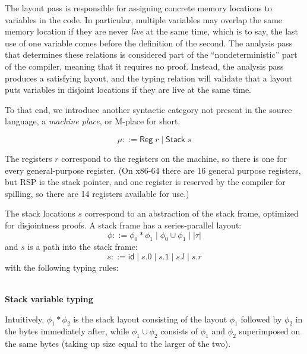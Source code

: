 \documentclass[acmsmall,nonacm]{acmart}
\newcommand{\proves}{\vdash}
\newcommand{\judgment}[2][]{\noindent\\\textbf{#1}\hspace{\stretch{1}}\fbox{$#2$}\nopagebreak}
\newcommand*{\axiom}[2][]{\infer[#1]{}{#2}}
\begin{document}
The layout pass is responsible for assigning concrete memory locations to variables in the code. In particular, multiple variables may overlap the same memory location if they are never \emph{live} at the same time, which is to say, the last use of one variable comes before the definition of the second. The analysis pass that determines these relations is considered part of the ``nondeterministic'' part of the compiler, meaning that it requires no proof. Instead, the analysis pass produces a satisfying layout, and the typing relation will validate that a layout puts variables in disjoint locations if they are live at the same time.

To that end, we introduce another syntactic category not present in the source language, a \emph{machine place}, or M-place for short.

$$\mu::=\mathsf{Reg}\;r\mid \mathsf{Stack}\;s$$

The registers $r$ correspond to the registers on the machine, so there is one for every general-purpose register. (On x86-64 there are 16 general purpose registers, but RSP is the stack pointer, and one register is reserved by the compiler for spilling, so there are 14 registers available for use.)

The stack locations $s$ correspond to an abstraction of the stack frame, optimized for disjointness proofs. A stack frame has a series-parallel layout:
$$\phi ::= \phi_0\ast\phi_1\mid \phi_0\cup \phi_1\mid |\tau|$$
and $s$ is a path into the stack frame:
$$s ::= \mathsf{id}\mid s.0\mid s.1 \mid s.l \mid s.r$$
with the following typing rules:

\judgment[Stack variable typing]{\phi\proves s:\phi'}

Intuitively, $\phi_1\ast\phi_2$ is the stack layout consisting of the layout $\phi_1$ followed by $\phi_2$ in the bytes immediately after, while $\phi_1\cup\phi_2$ consists of $\phi_1$ and $\phi_2$ superimposed on the same bytes (taking up size equal to the larger of the two).
\end{document}

